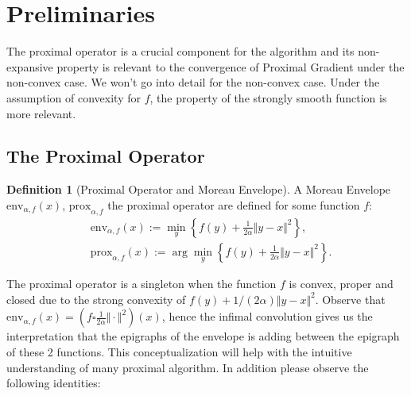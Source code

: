 \documentclass[]{article}
\theoremstyle{definition}
\newtheorem{definition}{Definition}
\begin{document}
\section{Preliminaries}
    The proximal operator is a crucial component for the algorithm and its non-expansive  property is relevant to the convergence of Proximal Gradient under the non-convex case. We won't go into detail for the non-convex case. Under the assumption of convexity for $f$, the property of the strongly smooth function is more relevant. 
    \subsection{The Proximal Operator}
        \begin{definition}[Proximal Operator and Moreau Envelope]
            A Moreau Envelope $\text{env}_{\alpha, f}(x)$, $\text{prox}_{\alpha, f}$ the proximal operator are defined for some function $f$: 
            $$
            \begin{aligned}
                & \text{env}_{\alpha, f}(x) := \min_{y}\left\lbrace
                    f(y) + \frac{1}{2 \alpha }\Vert y - x\Vert^2
                \right\rbrace, 
                \\
                & \text{prox}_{\alpha,f}(x) := 
                \arg\min_{y}\left\lbrace
                    f(y) + \frac{1}{2\alpha} \Vert y - x\Vert^2
                \right\rbrace. 
            \end{aligned}
            $$
        \end{definition}
        
        The proximal operator is a singleton when the function $f$ is convex, proper and closed due to the strong convexity of $f(y) + 1/(2\alpha)\Vert y - x\Vert^2$. Observe that $\text{env}_{\alpha, f}(x) = (f\square \frac{1}{2\alpha}\Vert \cdot \Vert^2)(x)$, hence the infimal convolution gives us the interpretation that the epigraphs of the envelope is adding between the epigraph of these 2 functions. This conceptualization will help with the intuitive understanding of many proximal algorithm. 
        In addition please observe the following identities: 
\end{document}
